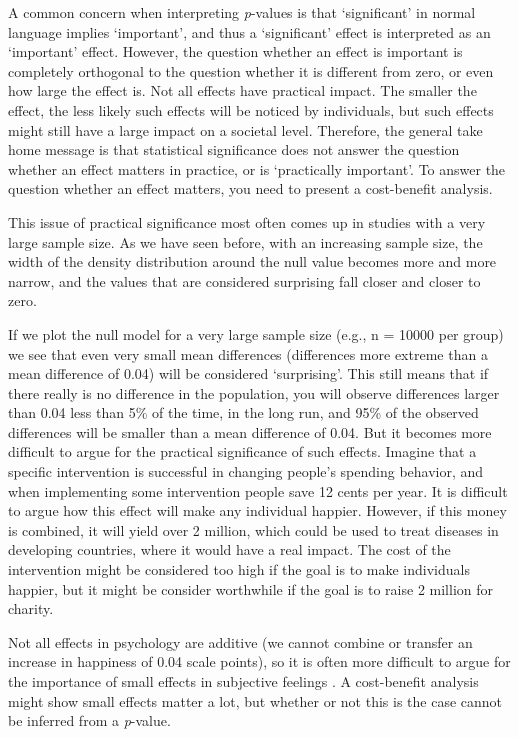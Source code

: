 \documentclass[
  oneside]{krantz}
\begin{document}
A common concern when interpreting \emph{p}-values is that `significant' in normal language implies `important', and thus a `significant' effect is interpreted as an `important' effect. However, the question whether an effect is important is completely orthogonal to the question whether it is different from zero, or even how large the effect is. Not all effects have practical impact. The smaller the effect, the less likely such effects will be noticed by individuals, but such effects might still have a large impact on a societal level. Therefore, the general take home message is that statistical significance does not answer the question whether an effect matters in practice, or is `practically important'. To answer the question whether an effect matters, you need to present a cost-benefit analysis.

This issue of practical significance most often comes up in studies with a very large sample size. As we have seen before, with an increasing sample size, the width of the density distribution around the null value becomes more and more narrow, and the values that are considered surprising fall closer and closer to zero.

If we plot the null model for a very large sample size (e.g., n = 10000 per group) we see that even very small mean differences (differences more extreme than a mean difference of 0.04) will be considered `surprising'. This still means that if there really is no difference in the population, you will observe differences larger than 0.04 less than 5\% of the time, in the long run, and 95\% of the observed differences will be smaller than a mean difference of 0.04. But it becomes more difficult to argue for the practical significance of such effects. Imagine that a specific intervention is successful in changing people's spending behavior, and when implementing some intervention people save 12 cents per year. It is difficult to argue how this effect will make any individual happier. However, if this money is combined, it will yield over 2 million, which could be used to treat diseases in developing countries, where it would have a real impact. The cost of the intervention might be considered too high if the goal is to make individuals happier, but it might be consider worthwhile if the goal is to raise 2 million for charity.

Not all effects in psychology are additive (we cannot combine or transfer an increase in happiness of 0.04 scale points), so it is often more difficult to argue for the importance of small effects in subjective feelings \citep{anvari_not_2021}. A cost-benefit analysis might show small effects matter a lot, but whether or not this is the case cannot be inferred from a \emph{p}-value.
\end{document}
